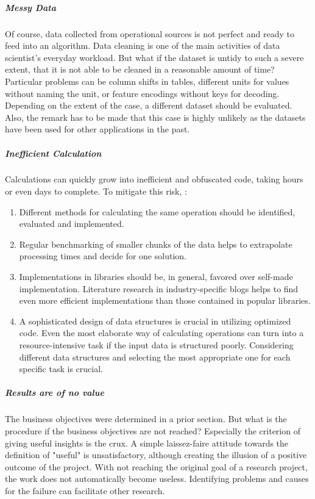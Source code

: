 \subparagraph{Messy Data} Of course, data collected from operational sources is not perfect and ready to feed into an algorithm. Data cleaning is one of the main activities of data scientist's everyday workload. But what if the dataset is untidy to such a severe extent, that it is not able to be cleaned in a reasonable amount of time?
Particular problems can be column shifts in tables, different units for values without naming the unit, or feature encodings without keys for decoding.
Depending on the extent of the case, a different dataset should be evaluated. Also, the remark has to be made that this case is highly unlikely as the datasets have been used for other applications in the past.

\subparagraph{Inefficient Calculation} Calculations can quickly grow into inefficient and obfuscated code, taking hours or even days to complete. To mitigate this risk, :

\begin{enumerate}
	\item Different methods for calculating the same operation should be identified, evaluated and implemented.
	\item Regular benchmarking of smaller chunks of the data helps to extrapolate processing times and decide for one solution.
	\item Implementations in libraries should be, in general, favored over self-made implementation. Literature research in industry-specific blogs helps to find even more efficient implementations than those contained in popular libraries.
	\item A sophisticated design of data structures is crucial in utilizing optimized code. Even the most elaborate way of calculating operations can turn into a resource-intensive task if the input data is structured poorly. Considering different data structures and selecting the most appropriate one for each specific task is crucial.
\end{enumerate}

\subparagraph{Results are of no value}
The business objectives were determined in a prior section. But what is the procedure if the business objectives are not reached? Especially the criterion of giving useful insights is the crux.
A simple laissez-faire attitude towards the definition of "useful" is unsatisfactory, although creating the illusion of a positive outcome of the project.
With not reaching the original goal of a research project, the work does not automatically become useless. Identifying problems and causes for the failure can facilitate other research.

